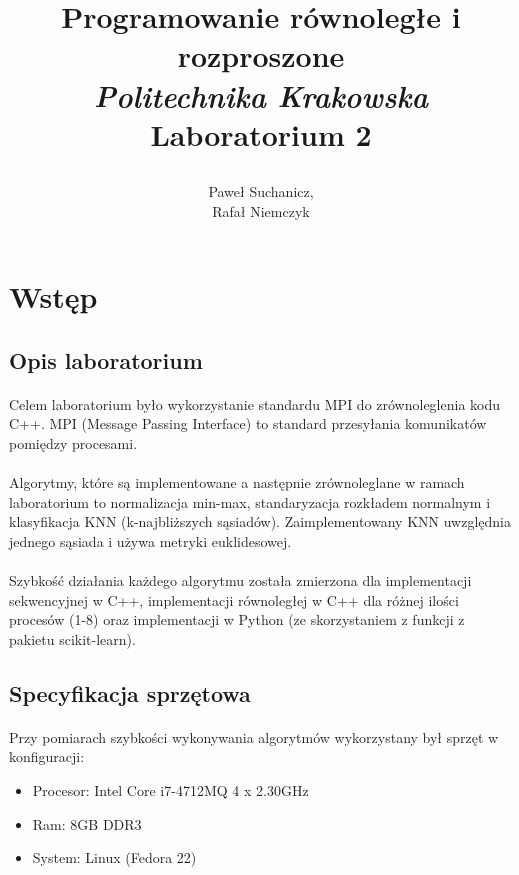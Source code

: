 \documentclass[a4paper,11pt]{article}
\title{
	\textbf{Programowanie równoległe i rozproszone}\vspace{40pt}
	\\\textit{Politechnika Krakowska} \\\vspace{40pt}
	Laboratorium 2
	\vspace{300pt}

}
\author{
	Paweł Suchanicz,\\
	Rafał Niemczyk
}
\begin{document}
\begin{titlepage}
\maketitle
\end{titlepage}

\begin{center}
\tableofcontents
\end{center}
\newpage
\section{Wstęp}
\subsection{Opis laboratorium}
\paragraph{}Celem laboratorium było wykorzystanie standardu MPI do zrównoleglenia kodu C++. MPI (Message Passing Interface) to standard przesyłania komunikatów pomiędzy procesami.
\paragraph{}Algorytmy, które są implementowane a następnie zrównoleglane w ramach laboratorium to normalizacja min-max, standaryzacja rozkładem normalnym i klasyfikacja KNN (k-najbliższych sąsiadów). Zaimplementowany KNN  uwzględnia jednego sąsiada i używa metryki euklidesowej.
\paragraph{}Szybkość działania każdego algorytmu została zmierzona dla implementacji sekwencyjnej w C++, implementacji równoległej w C++ dla różnej ilości procesów (1-8) oraz implementacji w Python (ze skorzystaniem z funkcji z pakietu scikit-learn).
\subsection{Specyfikacja sprzętowa}
\paragraph{}Przy pomiarach szybkości wykonywania algorytmów wykorzystany był sprzęt w konfiguracji:
\begin{itemize}
\item Procesor: Intel Core i7-4712MQ 4 x 2.30GHz
\item Ram: 8GB DDR3
\item System: Linux (Fedora 22)
\end{itemize}
\end{document}
